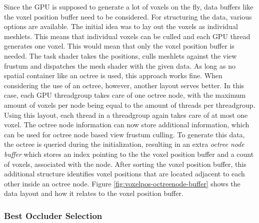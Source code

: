 \noindent
Since the \ac{GPU} is supposed to generate a lot of voxels on the fly, data buffers like the voxel position buffer 
need to be considered.
For structuring the data, various options are available. The initial idea was to lay out the voxels as individual 
meshlets. This means that individual voxels can be culled and each \ac{GPU} thread generates one voxel. This would 
mean that only the voxel position buffer is needed. The task shader takes the positions, culls meshlets 
against the view frustum and dispatches the mesh shader with the given data. As long as no spatial container like 
an octree is used, this approach works fine. When considering the use of an octree, however, another layout serves 
better. In this case, each \ac{GPU} threadgroup takes care of one octree node, with the maximum amount of voxels 
per node being equal to the amount of threads per threadgroup. Using this layout, each thread in a threadgroup 
again takes care of at most one voxel. The octree node information can now store additional information, which can 
be used for octree node based view frustum culling. To generate this data, the octree is queried during the 
initialization, resulting in an extra \emph{octree node buffer} which stores an index pointing to the the voxel 
position buffer and a count of voxels, associated with the node. After sorting the voxel position buffer, this 
additional structure identifies voxel positions that are located adjacent to each other inside an octree node. Figure 
\ref{fig:voxelpos-octreenode-buffer} shows the data layout and how it relates to the voxel position buffer. 


\subsubsection*{Best Occluder Selection} \label{subsec-best-occluder-selection}

